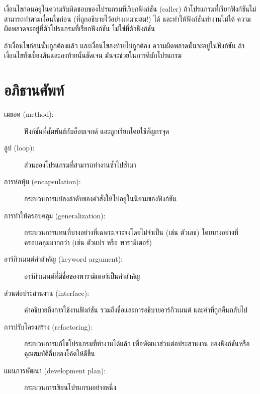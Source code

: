 เงื่อนไขก่อนอยู่ในความรับผิดชอบของโปรแกรมที่เรียกฟังก์ชัน (caller) ถ้าโปรแกรมที่เรียกฟังก์ชันไม่สามารถทำตามเงื่อนไขก่อน 
(ที่ถูกอธิบายไว้อย่างเหมาะสม!) ได้ และทำให้ฟังก์ชันทำงานไม่ได้ ความผิดพลาดจะอยู่ที่ตัวโปรแกรมที่เรียกฟังก์ชัน 
ไม่ใช่ที่ตัวฟังก์ชัน

ถ้าเงื่อนไขก่อนนั้นถูกต้องแล้ว และเงื่อนไขลงท้ายไม่ถูกต้อง ความผิดพลาดนั้นจะอยู่ในฟังก์ชัน
ถ้าเงื่อนไขทั้งเบื้องต้นและลงท้ายนั้นชัดเจน มันจะช่วยในการดีบักโปรแกรม


\section{อภิธานศัพท์}

\begin{description}

\item[เมธอด (method):] ฟังก์ชันที่สัมพันธ์กับอ็อบเจกต์ และถูกเรียกโดยใช้สัญกรจุด

\item[ลูป (loop):] ส่วนของโปรแกรมที่สามารถทำงานซ้ำไปซ้ำมา 

\item[การห่อหุ้ม (encapsulation):] กระบวนการแปลงลำดับของคำสั่งให้ไปอยู่ในนิยามของฟังก์ชัน 

\item[การทำให้ครอบคลุม (generalization):] กระบวนการแทนที่บางอย่างที่เฉพาะเจาะจงโดยไม่จำเป็น (เช่น ตัวเลข)
โดยบางอย่างที่ครอบคลุมมากกว่า (เช่น ตัวแปร หรือ พารามิเตอร์)

\item[อาร์กิวเมนต์คำสำคัญ (keyword argument):] อาร์กิวเมนต์ที่มีชื่อของพารามิเตอร์เป็นคำสำคัญ

\item[ส่วนต่อประสานงาน (interface):] คำอธิบายถึงการใช้งานฟังก์ชัน รวมถึงชื่อและการอธิบายอาร์กิวเมนต์
และค่าที่ถูกคืนกลับไป

\item[การปรับโครงสร้าง (refactoring):] กระบวนการแก้ไขโปรแกรมที่ทำงานได้แล้ว เพื่อพัฒนาส่วนต่อประสานงาน
ของฟังก์ชันหรือคุณสมบัติอื่นของโค้ดให้ดีขึ้น

\item[แผนการพัฒนา (development plan):] กระบวนการเขียนโปรแกรมอย่างหนึ่ง


\end{description}
